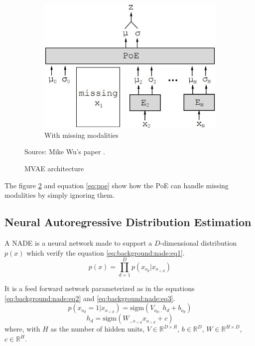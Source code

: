 \documentclass[12pt]{report}
\begin{document}
\begin{figure}[h]
\begin{subfigure}[t]{0.49\textwidth}
        \includegraphics[width=.9 \textwidth]{images/nn/architectures/mvae_missing.jpg}
        \caption{With missing modalities}
        \label{fig:mvae_architecture_missing}
    \end{subfigure}
    \caption{MVAE architecture}
    Source: Mike Wu's paper \cite{wu_multimodal_2018}.
    \label{fig:mvae_architecture}
\end{figure}

The figure \ref{fig:mvae_architecture} and equation \ref{eq:poe} show how the PoE can handle missing modalities by simply ignoring them.

\subsection{Neural Autoregressive Distribution Estimation}
\label{sec:back:nade}

A NADE \cite{uria_neural_2016, uria_deep_2014} is a neural network made to support a $D$-dimensional distribution $p(x)$ which verify the equation \ref{eq:background:nade:eq1}.
\begin{equation}
    p(x) = \prod_{d=1}^{D} p(x_{o_{d}} | x_{o_{<d}})
    \label{eq:background:nade:eq1}
\end{equation}

It is a feed forward network parameterized as in the equations \ref{eq:background:nade:eq2} and \ref{eq:background:nade:eq3}.
\begin{equation}
    p(x_{o_{d}} = 1 | x_{o_{<d}}) = \text{sigm}(V_{o_{d}, .} h_{d} + b_{o_{d}})
    \label{eq:background:nade:eq2}
\end{equation}
\begin{equation}
    h_d = \text{sigm}(W_{., o_{<d}} x_{o_{<d}} + c)
    \label{eq:background:nade:eq3}
\end{equation}
where, with $H$ as the number of hidden units, $V \in \mathbb{R}^{D \times R}$, $b \in \mathbb{R}^{D}$, $W \in \mathbb{R}^{H \times D}$, $c \in \mathbb{R}^{H}$.
\end{document}
